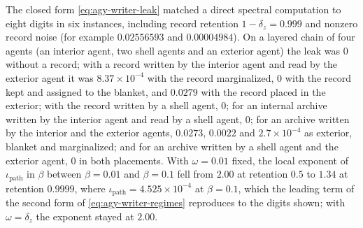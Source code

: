 \begin{numcheck}\label{chk:agy-writer-leak}
The closed form \eqref{eq:agy-writer-leak} matched a direct spectral computation to eight digits in six instances, including record retention $1-\delta_z=0.999$ and nonzero record noise (for example $0.02556593$ and $0.00004984$). On a layered chain of four agents (an interior agent, two shell agents and an exterior agent) the leak was $0$ without a record; with a record written by the interior agent and read by the exterior agent it was $8.37\times10^{-4}$ with the record marginalized, $0$ with the record kept and assigned to the blanket, and $0.0279$ with the record placed in the exterior; with the record written by a shell agent, $0$; for an internal archive written by the interior agent and read by a shell agent, $0$; for an archive written by the interior and the exterior agents, $0.0273$, $0.0022$ and $2.7\times10^{-4}$ as exterior, blanket and marginalized; and for an archive written by a shell agent and the exterior agent, $0$ in both placements. With $\omega=0.01$ fixed, the local exponent of $\iota_{\mathrm{path}}$ in $\beta$ between $\beta=0.01$ and $\beta=0.1$ fell from $2.00$ at retention $0.5$ to $1.34$ at retention $0.9999$, where $\iota_{\mathrm{path}}=4.525\times10^{-4}$ at $\beta=0.1$, which the leading term of the second form of \eqref{eq:agy-writer-regimes} reproduces to the digits shown; with $\omega=\delta_z$ the exponent stayed at $2.00$.
\end{numcheck}

